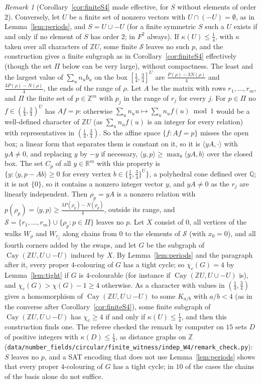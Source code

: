 \documentclass[11pt,a4paper]{amsart}
\theoremstyle{remark}
\newtheorem*{remark}{Remark}
\newcommand{\Q}{\mathbb{Q}}
\newcommand{\R}{\mathbb{R}}
\newcommand{\Z}{\mathbb{Z}}
\newcommand{\Cay}{\operatorname{Cay}}
\begin{document}
\begin{remark}[Corollary~\ref{cor:finiteS4} made effective, for $S$ without elements of order $2$]
Conversely, let $U$ be a finite set of nonzero vectors with $U\cap(-U)=\emptyset$, as in Lemma~\ref{lem:periods}, and
$S=U\cup-U$ (for a finite symmetric $S$ such a $U$ exists if and only if no element of $S$ has order $2$; in $F^2$
always). If $\kappa(U)\le\frac14$, with $\kappa$ taken over all characters of $\Z U$, some finite $\mathcal S$ leaves
no such $p$, and the construction gives a finite subgraph as in Corollary~\ref{cor:finiteS4} effectively (though the
set $\Pi$ below can be very large), without compactness. The least and the largest value of $\sum_un_ub_u$ on the box
$[\frac14,\frac34]^U$ are $\frac{P(\rho)-3N(\rho)}4$ and $\frac{3P(\rho)-N(\rho)}4$, the ends of the range of $\rho$.
Let $A$ be the matrix with rows $r_1,\dots,r_m$, and $\Pi$ the finite set of $p\in\Z^m$ with $p_j$ in the range of
$r_j$ for every $j$. For $p\in\Pi$ no $f\in(\frac14,\frac34)^U$ has $Af=p$: otherwise
$\sum_un_uu\mapsto\sum_un_uf(u)\bmod1$ would be a well-defined character of $\Z U$ (as $\sum_un_uf(u)$ is an integer
for every relation) with representatives in $(\frac14,\frac34)$. So the affine space $\{f:Af=p\}$ misses the open box;
a linear form that separates them is constant on it, so it is $\langle yA,\cdot\rangle$ with $yA\ne0$, and replacing
$y$ by $-y$ if necessary, $\langle y,p\rangle\ge\max_b\langle yA,b\rangle$ over the closed box. The set $C_p$ of all
$y\in\R^m$ with this property is $\{y:\langle y,p-Ab\rangle\ge0\text{ for every vertex }b\in\{\frac14,\frac34\}^U\}$,
a polyhedral cone defined over $\Q$; it is not $\{0\}$, so it contains a nonzero integer vector $y$, and $yA\ne0$ as
the $r_j$ are linearly independent. Then $\rho_p=yA$ is a nonzero relation with $p(\rho_p)=\langle y,p\rangle\ge
\frac{3P(\rho_p)-N(\rho_p)}4$, outside its range, and $\mathcal S=\{r_1,\dots,r_m\}\cup\{\rho_p:p\in\Pi\}$ leaves no
$p$. Let $X$ consist of $0$, all vertices of the walks $W_\rho$ and $W_{r_j}$ along chains from $0$ to the elements of
$\mathcal S$ (with $x_0=0$), and all fourth corners added by the swaps, and let $G$ be the subgraph of $\Cay(\Z
U,U\cup-U)$ induced by $X$. By Lemma~\ref{lem:periods} and the paragraph after it, every proper $4$-colouring of $G$
has a tight cycle; so $\chi_c(G)=4$ by Lemma~\ref{lem:tight} if $G$ is $4$-colourable (for instance if $\Cay(\Z
U,U\cup-U)$ is), and $\chi_c(G)>\chi(G)-1\ge4$ otherwise. As a character with values in $(\frac14,\frac34)$ gives a
homomorphism of $\Cay(\Z U,U\cup-U)$ to some $K_{a/b}$ with $a/b<4$ (as in the converse after
Corollary~\ref{cor:finiteS4}), some finite subgraph of $\Cay(\Z U,U\cup-U)$ has $\chi_c\ge4$ if and only if
$\kappa(U)\le\frac14$, and then this construction finds one.
The referee checked the remark by computer on $15$ sets $D$ of positive integers with
$\kappa(D)\le\frac14$, as distance graphs on $\Z$
(\nolinkurl{data/number_fields/circular/finite_witness/indep_W4/remark_check.py}): $S$ leaves no $p$, and a SAT
encoding that does not use Lemma~\ref{lem:periods} shows that every proper $4$-colouring of $G$ has a tight cycle; in
$10$ of the cases the chains of the basis alone do not suffice.
\end{remark}
\end{document}
